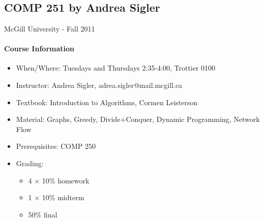 \documentclass[9pt, letterpaper, oneside]{article}
\date{}
\begin{document}

\section*{}
\begin{center}
\section*{COMP 251 by Andrea Sigler}
\small{McGill University - Fall 2011} 
\end{center}


\paragraph{Course Information}

\begin{itemize}
\item When/Where: Tuesdays and Thursdays 2:35-4:00, Trottier 0100
\item Instructor: Andrea Sigler, adrea.sigler@mail.mcgill.ca
\item Textbook: Introduction to Algorithms, Cormen Leisterson
\item Material: Graphs, Greedy, Divide+Conquer, Dynamic Programming, Network Flow
\item Prerequisites: COMP 250
\item Grading:
	\begin{itemize}
		\item 4 $\times$ 10\% homework
		\item 1 $\times$ 10\% midterm
		\item 50\% final
	\end{itemize}
\end{itemize}
\end{document}
